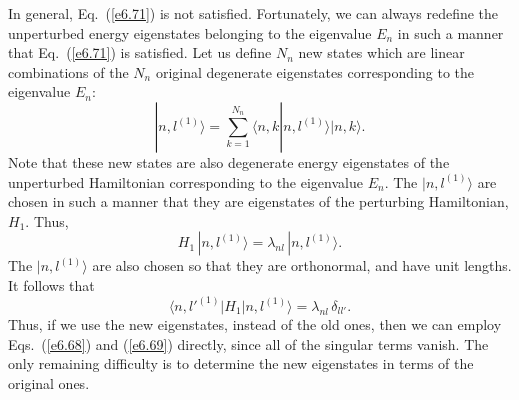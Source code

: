 In general, Eq.~(\ref{e6.71}) is not satisfied. Fortunately, we can always redefine
the unperturbed energy eigenstates belonging to the eigenvalue $E_n$ in such
a manner that Eq.~(\ref{e6.71}) is satisfied. Let us define $N_n$ new states
which are linear combinations of the $N_n$ original degenerate
eigenstates corresponding
to the eigenvalue $E_n$:
\begin{equation}
|n,l^{(1)}\rangle = \sum_{k=1}^{N_n} \langle n,k|n,l^{(1)}\rangle |n,k\rangle.
\end{equation}
Note that these new states are also degenerate energy eigenstates 
of the unperturbed Hamiltonian corresponding to the eigenvalue $E_n$. 
The $|n,l^{(1)}\rangle$ are chosen in
such a manner that they are eigenstates of the perturbing
Hamiltonian, $H_1$. Thus,
\begin{equation}\label{e6.71a}
H_1\, |n, l^{(1)}\rangle = \lambda_{nl} \,|n, l^{(1)}\rangle.
\end{equation}
The $|n,l^{(1)}\rangle$ are also chosen so that they are orthonormal,
and have unit lengths.
It follows that
\begin{equation}
\langle n, l'^{(1)} | H_1|n, l^{(1)}\rangle = \lambda_{nl}\,\delta_{ll'}.
\end{equation}
Thus, if we use the new eigenstates, instead of the old ones, then we can employ
Eqs.~(\ref{e6.68}) and (\ref{e6.69}) directly, since all of the singular terms vanish.
The only remaining difficulty is to determine the new eigenstates in terms of
the original ones.  

